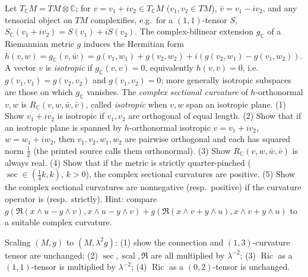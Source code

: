 \begin{remark}
  \label{rem:pet-ch3-ex-17}


  Let $T_{\mathbb C}M=TM\otimes\mathbb C$; for $v=v_1+iv_2\in T_{\mathbb C}M$
  ($v_1,v_2\in TM$), $\bar v=v_1-iv_2$, and any tensorial object on $TM$
  complexifies, e.g.\ for a $(1,1)$-tensor $S$,
  $S_{\mathbb C}(v_1+iv_2)=S(v_1)+iS(v_2)$. The complex-bilinear extension
  $g_{\mathbb C}$ of a Riemannian metric $g$ induces the Hermitian form
  $h(v,w)=g_{\mathbb C}(v,\bar w)
  =g(v_1,w_1)+g(v_2,w_2)+i(g(v_2,w_1)-g(v_1,w_2))$. A vector $v$
  is \emph{isotropic} if $g_{\mathbb C}(v,v)=0$, equivalently $h(v,\bar v)=0$, i.e.\
  $g(v_1,v_1)=g(v_2,v_2)$ and $g(v_1,v_2)=0$; more generally isotropic subspaces
  are those on which $g_{\mathbb C}$ vanishes. The \emph{complex sectional
  curvature} of $h$-orthonormal $v,w$ is $R_{\mathbb C}(v,w,\bar w,\bar v)$,
  called \emph{isotropic} when $v,w$ span an isotropic plane. (1) Show $v_1+iv_2$
  is isotropic if $v_1,v_2$ are orthogonal of equal length. (2) Show that if an
  isotropic plane is spanned by $h$-orthonormal isotropic $v=v_1+iv_2$,
  $w=w_1+iw_2$, then $v_1,v_2,w_1,w_2$ are pairwise orthogonal and each has
  squared norm $\tfrac12$ (the printed source calls them orthonormal). (3) Show
  $R_{\mathbb C}(v,w,\bar w,\bar v)$ is always real. (4) Show that if the metric
  is strictly quarter-pinched ($\sec\in(\tfrac14k,k)$, $k>0$), the complex
  sectional curvatures are positive. (5) Show the complex sectional curvatures
  are nonnegative (resp.\ positive) if the curvature operator is (resp.\
  strictly). Hint: compare
  $g(\mathfrak R(x\wedge u-y\wedge v),x\wedge u-y\wedge v)+g(\mathfrak R(x\wedge
  v+y\wedge u),x\wedge v+y\wedge u)$ to a suitable complex curvature.
\end{remark}

\begin{remark}[Curvature under metric scaling]
  \label{rem:pet-ch3-ex-18}


  \dcref{ch3:3.4.18}
  Scaling $(M,g)$ to $(M,\lambda^2g)$: (1) show the connection and $(1,3)$-curvature
  tensor are unchanged; (2) $\sec,\operatorname{scal},\mathfrak R$ are all
  multiplied by $\lambda^{-2}$; (3) $\operatorname{Ric}$ as a $(1,1)$-tensor is
  multiplied by $\lambda^{-2}$; (4) $\operatorname{Ric}$ as a $(0,2)$-tensor is
  unchanged.
\end{remark}

